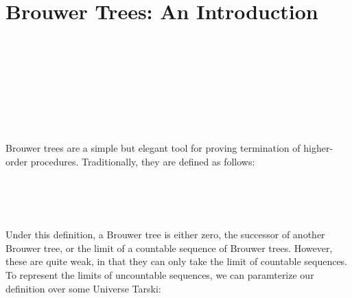 \section{Brouwer Trees: An Introduction}
\begin{code}[hide]%
%
\>[2]\AgdaSymbol{\{-\#}\AgdaSpace{}%
\AgdaSpace{}%
\AgdaSpace{}%
\AgdaSymbol{\#-\}}\<%
\\
%
\>[2]\AgdaSpace{}%
\AgdaSpace{}%
\AgdaSpace{}%
\AgdaSpace{}%
\AgdaSymbol{(}\AgdaSpace{}%
\AgdaSymbol{;}\AgdaSpace{}%
\AgdaOperator{\AgdaFunction{\AgdaUnderscore{}<\AgdaUnderscore{}}}\AgdaSymbol{)}\<%
\\
%
\>[2]\AgdaSpace{}%
\AgdaSpace{}%
\<%
\\
%
\>[2]\AgdaSpace{}%
\AgdaSpace{}%
\<%
\\
%
\>[2]\AgdaSpace{}%
\AgdaSpace{}%
\<%
\\
%
\>[2]\AgdaSpace{}%
\AgdaSpace{}%
\<%
\\
%
\>[2]\AgdaSpace{}%
\AgdaSpace{}%
\<%
\\
\>[0]\<%
\end{code}

Brouwer trees  are a simple but elegant tool for proving termination of higher-order procedures.
Traditionally, they are defined as follows:
\begin{code}%
\>[0][@{}l@{\AgdaIndent{1}}]%
\>[2]\AgdaSpace{}%
\AgdaSpace{}%
\AgdaSymbol{:}\AgdaSpace{}%
\AgdaSpace{}%
\<%
\\
\>[2][@{}l@{\AgdaIndent{0}}]%
\>[4]\AgdaSpace{}%
\AgdaSymbol{:}\AgdaSpace{}%
\<%
\\
%
\>[4]\AgdaSpace{}%
\AgdaSymbol{:}\AgdaSpace{}%
\AgdaSpace{}%
\AgdaSpace{}%
\<%
\\
%
\>[4]\AgdaSpace{}%
\AgdaSymbol{:}\AgdaSpace{}%
\AgdaSymbol{(}\AgdaSpace{}%
\AgdaSpace{}%
\AgdaSymbol{)}\AgdaSpace{}%
\AgdaSpace{}%
\<%
\end{code}
Under this definition, a Brouwer tree is either zero, the successor of another Brouwer tree, or the limit of a countable sequence of Brouwer trees. However, these are quite weak, in that they can only take the limit of countable sequences.
To represent the limits of uncountable sequences, we can paramterize our definition over some Universe \ala Tarski:

